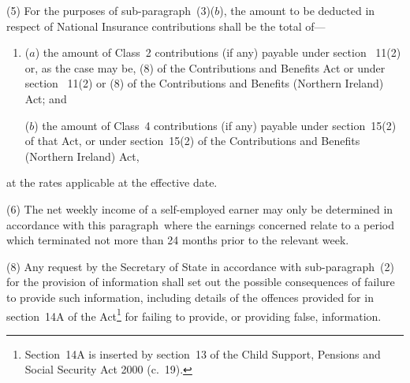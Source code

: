 \documentclass[12pt,a4paper]{article}
\begin{document}
(5) For the purposes of sub-paragraph~(3)($b$), the amount to be deducted in respect of National Insurance contributions shall be the total of—
\begin{enumerate}\item[]
($a$) the amount of Class~2 contributions (if any) payable under section~%
11(2)  %
or, as the case may be, 
(8)  %
of the Contributions and Benefits Act or under section~%
11(2)  %
or 
(8)  %
of the Contributions and Benefits (Northern Ireland) Act; and

($b$) the amount of Class~4 contributions (if any) payable under section~15(2) of that Act, or under section~15(2) of the Contributions and Benefits (Northern Ireland) Act,
\end{enumerate}
at the rates applicable at the effective date.

(6) The net weekly income of a self-employed earner may only be determined in accordance with this paragraph~where the earnings concerned relate to a period which terminated not more than 24 months prior to the relevant week.

%

(8) Any request by the Secretary of State in accordance with sub-paragraph~(2) for the provision of information shall set out the possible consequences of failure to provide such information, including details of the offences provided for in section~14A of the Act\footnote{Section~14A is inserted by section~13 of the Child Support, Pensions and Social Security Act 2000 (c.\ 19).} for failing to provide, or providing false, information.
\end{document}
